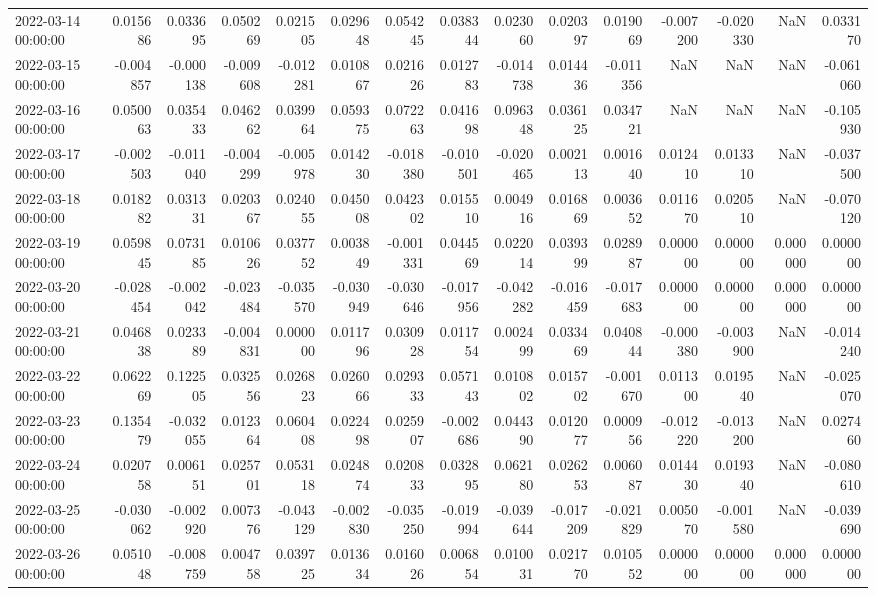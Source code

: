 \begin{tabular}{lrrrrrrrrrrrrrr}
2022-03-14 00:00:00 & 0.015686 & 0.033695 & 0.050269 & 0.021505 & 0.029648 & 0.054245 & 0.038344 & 0.023060 & 0.020397 & 0.019069 & -0.007200 & -0.020330 & NaN & 0.033170 \\
2022-03-15 00:00:00 & -0.004857 & -0.000138 & -0.009608 & -0.012281 & 0.010867 & 0.021626 & 0.012783 & -0.014738 & 0.014436 & -0.011356 & NaN & NaN & NaN & -0.061060 \\
2022-03-16 00:00:00 & 0.050063 & 0.035433 & 0.046262 & 0.039964 & 0.059375 & 0.072263 & 0.041698 & 0.096348 & 0.036125 & 0.034721 & NaN & NaN & NaN & -0.105930 \\
2022-03-17 00:00:00 & -0.002503 & -0.011040 & -0.004299 & -0.005978 & 0.014230 & -0.018380 & -0.010501 & -0.020465 & 0.002113 & 0.001640 & 0.012410 & 0.013310 & NaN & -0.037500 \\
2022-03-18 00:00:00 & 0.018282 & 0.031331 & 0.020367 & 0.024055 & 0.045008 & 0.042302 & 0.015510 & 0.004916 & 0.016869 & 0.003652 & 0.011670 & 0.020510 & NaN & -0.070120 \\
2022-03-19 00:00:00 & 0.059845 & 0.073185 & 0.010626 & 0.037752 & 0.003849 & -0.001331 & 0.044569 & 0.022014 & 0.039399 & 0.028987 & 0.000000 & 0.000000 & 0.000000 & 0.000000 \\
2022-03-20 00:00:00 & -0.028454 & -0.002042 & -0.023484 & -0.035570 & -0.030949 & -0.030646 & -0.017956 & -0.042282 & -0.016459 & -0.017683 & 0.000000 & 0.000000 & 0.000000 & 0.000000 \\
2022-03-21 00:00:00 & 0.046838 & 0.023389 & -0.004831 & 0.000000 & 0.011796 & 0.030928 & 0.011754 & 0.002499 & 0.033469 & 0.040844 & -0.000380 & -0.003900 & NaN & -0.014240 \\
2022-03-22 00:00:00 & 0.062269 & 0.122505 & 0.032556 & 0.026823 & 0.026066 & 0.029333 & 0.057143 & 0.010802 & 0.015702 & -0.001670 & 0.011300 & 0.019540 & NaN & -0.025070 \\
2022-03-23 00:00:00 & 0.135479 & -0.032055 & 0.012364 & 0.060408 & 0.022498 & 0.025907 & -0.002686 & 0.044390 & 0.012077 & 0.000956 & -0.012220 & -0.013200 & NaN & 0.027460 \\
2022-03-24 00:00:00 & 0.020758 & 0.006151 & 0.025701 & 0.053118 & 0.024874 & 0.020833 & 0.032895 & 0.062180 & 0.026253 & 0.006087 & 0.014430 & 0.019340 & NaN & -0.080610 \\
2022-03-25 00:00:00 & -0.030062 & -0.002920 & 0.007376 & -0.043129 & -0.002830 & -0.035250 & -0.019994 & -0.039644 & -0.017209 & -0.021829 & 0.005070 & -0.001580 & NaN & -0.039690 \\
2022-03-26 00:00:00 & 0.051048 & -0.008759 & 0.004758 & 0.039725 & 0.013634 & 0.016026 & 0.006854 & 0.010031 & 0.021770 & 0.010552 & 0.000000 & 0.000000 & 0.000000 & 0.000000 \\

\end{tabular}
